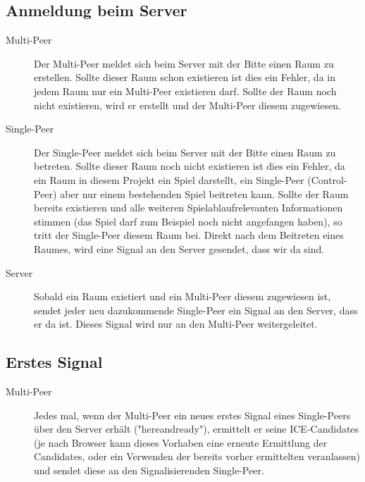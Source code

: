 \subsection{Anmeldung beim Server}
\begin{description}
\item[Multi-Peer]
Der Multi-Peer meldet sich beim Server mit der Bitte einen Raum zu erstellen. 
Sollte dieser Raum schon existieren ist dies ein Fehler, da in jedem Raum nur 
ein Multi-Peer existieren darf. Sollte der Raum noch nicht existieren, wird er 
erstellt und der Multi-Peer diesem zugewiesen.

\item[Single-Peer]
Der Single-Peer meldet sich beim Server mit der Bitte einen Raum zu betreten. 
Sollte dieser Raum noch nicht existieren ist dies ein Fehler, da ein Raum in 
diesem Projekt ein Spiel darstellt, ein Single-Peer (Control-Peer) aber nur 
einem bestehenden Spiel beitreten kann. Sollte der Raum bereits existieren und 
alle weiteren Spielablaufrelevanten Informationen stimmen (das Spiel darf zum 
Beispiel noch nicht angefangen haben), so tritt der Single-Peer diesem Raum bei. 
Direkt nach dem Beitreten eines Raumes, wird eine Signal an den Server gesendet, 
dass wir da sind.

\item[Server]
Sobald ein Raum existiert und ein Multi-Peer diesem zugewiesen ist, sendet jeder 
neu dazukommende Single-Peer ein Signal an den Server, dass er da ist. Dieses 
Signal wird nur an den Multi-Peer weitergeleitet.
\end{description}



\subsection{Erstes Signal}
\begin{description}
\item[Multi-Peer]
Jedes mal, wenn der Multi-Peer ein neues erstes Signal eines Single-Peers über 
den Server erhält ("hereandready"), ermittelt er seine ICE-Candidates (je nach Browser kann dieses Vorhaben eine erneute Ermittlung der Candidates, oder ein Verwenden der bereits vorher ermittelten veranlassen) und sendet 
diese an den Signalisierenden Single-Peer.
\end{description}



